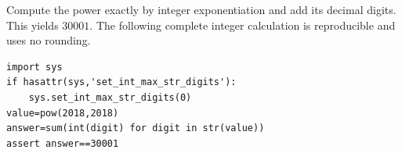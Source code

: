 Compute the power exactly by integer exponentiation and add its decimal digits. This yields $\boxed{30001}$. The following complete integer calculation is reproducible and uses no rounding.\begin{verbatim}
import sys
if hasattr(sys,'set_int_max_str_digits'):
    sys.set_int_max_str_digits(0)
value=pow(2018,2018)
answer=sum(int(digit) for digit in str(value))
assert answer==30001
\end{verbatim}
